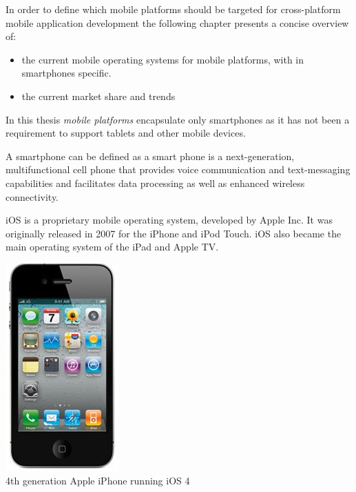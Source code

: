 



In order to define which mobile platforms should be targeted for cross-platform mobile application development the following chapter presents a concise overview of:

\begin{itemize}
\item
the current mobile operating systems for mobile platforms, with in smartphones specific. 
\item
the current market share and trends
\end{itemize}

In this thesis \emph{mobile platforms} encapsulate only smartphones as it has not been a requirement to support tablets and other mobile devices.

A smartphone can be defined as a smart phone is a next-generation, multifunctional cell phone that provides voice communication and text-messaging capabilities and facilitates data processing as well as enhanced wireless connectivity.\cite{Ni2006}



iOS is a proprietary mobile operating system, developed by Apple Inc. It was originally released in 2007 for the iPhone and iPod Touch. iOS also became the main operating system of the iPad and Apple TV.

\begin{centering}
\includegraphics[scale=0.5]{images/iphone4.jpg}\\{4th generation Apple iPhone running iOS 4}\\
\end{centering}



